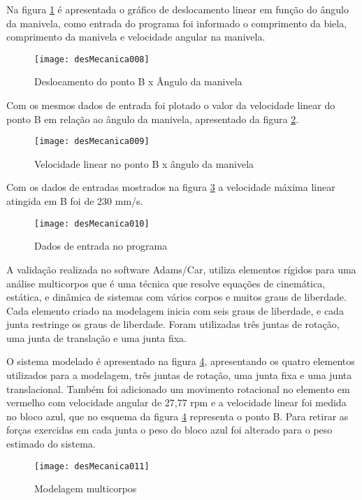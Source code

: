 		Na figura \ref{desMecanica008} é apresentada o gráfico de deslocamento linear em função do ângulo da manivela, como entrada do programa foi informado o comprimento da biela, comprimento da manivela e velocidade angular na manivela.

		\begin{figure}[h]
			\centering
			\texttt{[image: desMecanica008]}
			\caption{Deslocamento do ponto B x Ângulo da manivela}
			\label{desMecanica008}
		\end{figure}

		Com os mesmos dados de entrada foi plotado o valor da velocidade linear do ponto B em relação ao ângulo da manivela, apresentado da figura \ref{desMecanica009}.

		\begin{figure}[h]
			\centering
			\texttt{[image: desMecanica009]}
			\caption{Velocidade linear no ponto B x ângulo da manivela}
			\label{desMecanica009}
		\end{figure}

		Com os dados de entradas mostrados na figura \ref{desMecanica010} a velocidade máxima linear atingida em B foi de 230 mm/s.

		\begin{figure}[h]
			\centering
			\texttt{[image: desMecanica010]}
			\caption{Dados de entrada no programa}
			\label{desMecanica010}
		\end{figure}

		A validação realizada no software Adams/Car, utiliza elementos rígidos para uma análise multicorpos que é uma técnica que resolve equações de cinemática, estática, e dinâmica de sistemas com vários corpos e muitos graus de liberdade. Cada elemento criado na modelagem inicia com seis graus de liberdade, e cada junta restringe os graus de liberdade. Foram utilizadas três juntas de rotação, uma junta de translação e uma junta fixa.

		O sistema modelado é apresentado na figura \ref{desMecanica011}, apresentando os quatro elementos utilizados para a modelagem, três juntas de rotação, uma junta fixa e uma junta translacional. Também foi adicionado um movimento rotacional no elemento em vermelho com velocidade angular de 27,77 rpm e a velocidade linear foi medida no bloco azul, que no esquema da figura \ref{desMecanica011} representa o ponto B. Para retirar as forças exercidas em cada junta o peso do bloco azul foi alterado para o peso estimado do sistema.

		\begin{figure}[!h]
			\centering
			\texttt{[image: desMecanica011]}
			\caption{Modelagem multicorpos}
			\label{desMecanica011}
		\end{figure}


